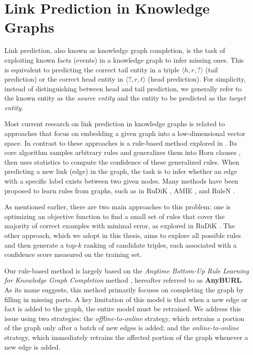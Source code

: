 \section{Link Prediction in Knowledge Graphs}


Link prediction, also known as knowledge graph completion, is the task of exploiting known facts (events) in a knowledge graph to infer missing ones. This is equivalent to predicting the correct tail entity in a triple $\langle h, r, ? \rangle$ (tail prediction) or the correct head entity in $\langle ?, r, t \rangle$ (head prediction). For simplicity, instead of distinguishing between head and tail prediction, we generally refer to the known entity as the \textit{source entity} and the entity to be predicted as the \textit{target entity}.

Most current research on link prediction in knowledge graphs is related to approaches that focus on embedding a given graph into a low-dimensional vector space. In contrast to these approaches is a rule-based method explored in \cite{burl}. Its core algorithm samples arbitrary rules and generalizes them into Horn clauses \cite{wiki:Horn}, then uses statistics to compute the confidence of these generalized rules. When predicting a new link (edge) in the graph, the task is to infer whether an edge with a specific label exists between two given nodes. Many methods have been proposed to learn rules from graphs, such as in RuDiK \cite{ortona2018robust}, AMIE \cite{galarraga2015fast}, and RuleN \cite{meilicke2018fine}.

As mentioned earlier, there are two main approaches to this problem: one is optimizing an objective function to find a small set of rules that cover the majority of correct examples with minimal error, as explored in RuDiK \cite{ortona2018robust}. The other approach, which we adopt in this thesis, aims to explore all possible rules and then generate a top-\(k\) ranking of candidate triples, each associated with a confidence score measured on the training set.

Our rule-based method is largely based on the \textit{Anytime Bottom-Up Rule Learning for Knowledge Graph Completion} method \cite{meilicke2019anytime}, hereafter referred to as \textbf{AnyBURL}. As its name suggests, this method primarily focuses on completing the graph by filling in missing parts. A key limitation of this model is that when a new edge or fact is added to the graph, the entire model must be retrained. We address this issue using two strategies: the \textit{offline-to-online} strategy, which retrains a portion of the graph only after a batch of new edges is added; and the \textit{online-to-online} strategy, which immediately retrains the affected portion of the graph whenever a new edge is added.

